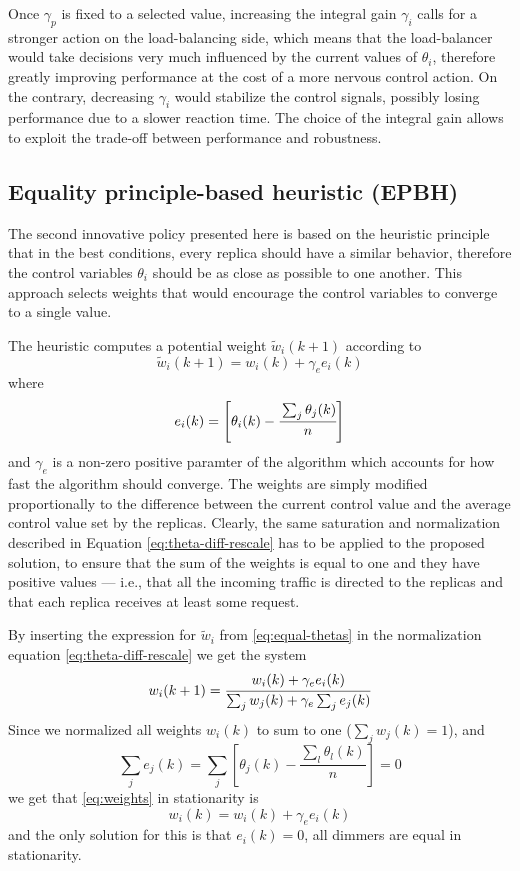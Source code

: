 Once $\gamma_p$ is fixed to a selected value, increasing the integral
gain $\gamma_i$ calls for a stronger action on the load-balancing
side, which means that the load-balancer would take decisions very
much influenced by the current values of $\theta_i$, therefore greatly
improving performance at the cost of a more nervous control action. On
the contrary, decreasing $\gamma_i$ would stabilize the control
signals, possibly losing performance due to a slower reaction
time. The choice of the integral gain allows to exploit the trade-off
between performance and robustness.


\subsection{Equality principle-based heuristic (EPBH)}

The second innovative policy presented here is based on the heuristic principle
that in the best conditions, every replica should have a similar
behavior, therefore the control variables $\theta_i$ should be as
close as possible to one another. This approach selects weights that
would encourage the control variables to converge to a single value.

The heuristic computes a potential weight $\tilde{w}_i(k+1)$ according
to
\begin{equation}
  \tilde{w}_i(k+1) = w_i(k) + \gamma_e e_i(k)
\label{eq:equal-thetas}
\end{equation}
where
$$e_i(k)=\left[ \theta_i (k) - \cfrac{\sum_j \theta_j (k) }{n} \right]$$
and $\gamma_e$ is a non-zero positive paramter of the algorithm which accounts
for how fast the algorithm should converge. The weights are simply modified
proportionally to the difference between the current control value and
the average control value set by the replicas. Clearly, the same
saturation and normalization described in Equation
\eqref{eq:theta-diff-rescale} has to be applied to the proposed
solution, to ensure that the sum of the weights is equal to one and
they have positive values --- i.e., that all the incoming traffic is
directed to the replicas and that each replica receives at least some
request.

By inserting the expression for $\tilde w_i$ from \eqref{eq:equal-thetas}
in the normalization equation \eqref{eq:theta-diff-rescale} we get the system
\begin{equation}
  w_i(k+1)=\cfrac{w_i(k)+\gamma_ee_i(k)}{\sum_jw_j(k)+\gamma_e\sum_je_j(k)}
\label{eq:weights}
\end{equation}
Since we normalized all weights $w_i(k)$ to sum to one ($\sum_jw_j(k)=1$), and
$$\sum_je_j(k)=\sum_j\left[\theta_j(k)-\frac{\sum_l\theta_l(k)}{n}\right]=0$$
we get that \eqref{eq:weights} in stationarity is
$$w_i(k)=w_i(k)+\gamma_ee_i(k)$$
and the only solution for this is that $e_i(k)=0$, all dimmers are equal in
stationarity.

